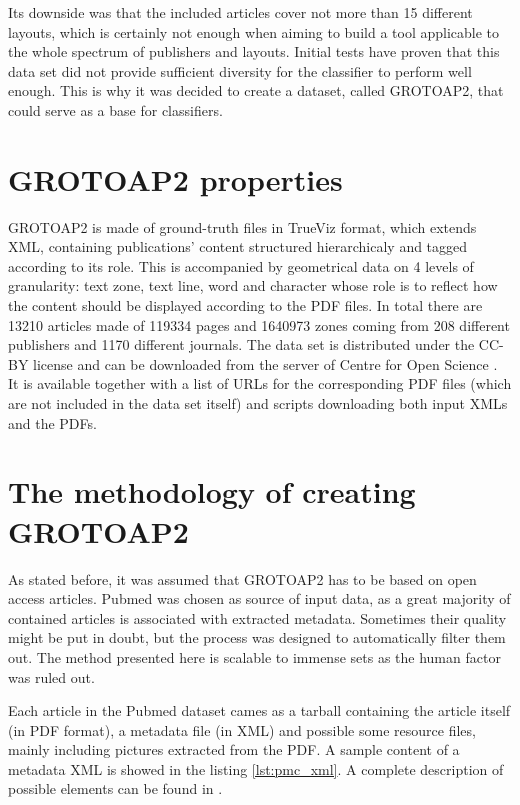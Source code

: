 Its downside was that the included articles cover not more than 15 different layouts, which is certainly not enough when aiming to build a tool applicable to the whole spectrum of publishers and layouts. Initial tests have proven that this data set did not provide sufficient diversity for the classifier to perform well enough. This is why it was decided to create a dataset, called GROTOAP2, that could serve as a base for classifiers.

\section{GROTOAP2 properties}
GROTOAP2 is made of ground-truth files in TrueViz format, which extends XML, containing publications' content structured hierarchicaly and tagged according to its role. This is accompanied by geometrical data on 4 levels of granularity: text zone, text line, word and character whose role is to reflect how the content should be displayed according to the PDF files. In total there are 13210 articles made of 119334 pages and 1640973 zones coming from 208 different publishers and 1170 different journals. The data set is distributed under the CC-BY license and can be downloaded from the server of Centre for Open Science \cite{CeON}. It is available together with a list of URLs for the corresponding PDF files (which are not included in the data set itself) and scripts downloading both input XMLs and the PDFs.

\section{The methodology of creating GROTOAP2}
As stated before, it was assumed that GROTOAP2 has to be based on open access articles. Pubmed was chosen as source of input data, as a great majority of contained articles is associated with extracted metadata. Sometimes their quality might be put in doubt, but the process was designed to automatically filter them out. The method presented here is scalable to immense sets as the human factor was ruled out.

Each article in the Pubmed dataset cames as a tarball containing the article itself (in PDF format), a metadata file (in XML) and possible some resource files, mainly including pictures extracted from the PDF. A sample content of a metadata XML is showed in the listing \ref{lst:pmc_xml}. A complete description of possible elements can be found in \cite{PubmedXML}.



